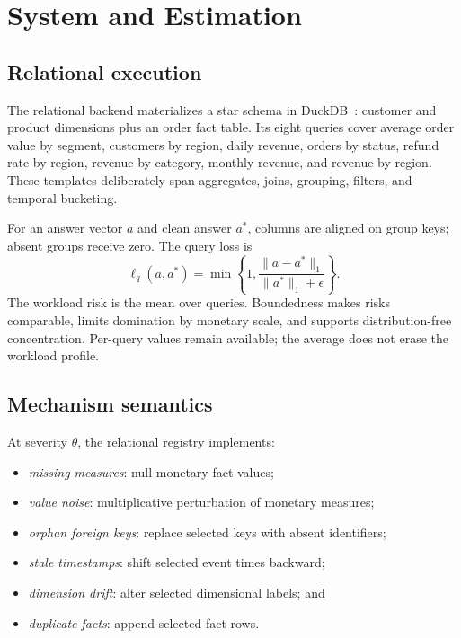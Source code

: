 \documentclass[conference]{IEEEtran}
\begin{document}
\section{System and Estimation}

\subsection{Relational execution}

The relational backend materializes a star schema in DuckDB~\cite{raasveldt2020duckdb}: customer and product dimensions plus an order fact table. Its eight queries cover average order value by segment, customers by region, daily revenue, orders by status, refund rate by region, revenue by category, monthly revenue, and revenue by region. These templates deliberately span aggregates, joins, grouping, filters, and temporal bucketing.

For an answer vector $a$ and clean answer $a^*$, columns are aligned on group keys; absent groups receive zero. The query loss is
\begin{equation}
 \ell_q(a,a^*)=\min\!\left\{1,
 \frac{\|a-a^*\|_1}{\|a^*\|_1+\epsilon}\right\}.
\end{equation}
The workload risk is the mean over queries. Boundedness makes risks comparable, limits domination by monetary scale, and supports distribution-free concentration. Per-query values remain available; the average does not erase the workload profile.

\subsection{Mechanism semantics}

At severity $\theta$, the relational registry implements:

\begin{itemize}
  \item \emph{missing measures}: null monetary fact values;
  \item \emph{value noise}: multiplicative perturbation of monetary measures;
  \item \emph{orphan foreign keys}: replace selected keys with absent identifiers;
  \item \emph{stale timestamps}: shift selected event times backward;
  \item \emph{dimension drift}: alter selected dimensional labels; and
  \item \emph{duplicate facts}: append selected fact rows.
\end{itemize}
\end{document}
